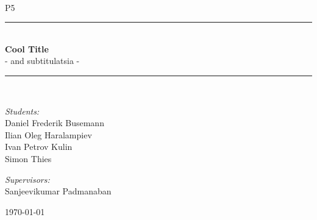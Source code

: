 \newcommand{\HRule}{\rule{\linewidth}{0.5 mm}}
\begin{titlepage}

\begin{center}
\\[0.5cm]

\textsc{\Large P5}\\[0.6cm]

\HRule \\[0.8cm]
{ \Huge \bfseries  Cool Title}\\[0.4cm]

  \Large{ - and subtitulatsia -
  }
\HRule \\[1.2cm]

\begin{minipage}{0.49\textwidth}
\begin{flushleft} \large
\emph{Students:}\\
Daniel Frederik Busemann\\
Ilian Oleg Haralampiev\\
Ivan Petrov Kulin\\
Simon Thies\\
\end{flushleft}
\end{minipage}
\begin{minipage}{0.49\textwidth}
\begin{flushright} \large
\emph{Supervisors:} \\
Sanjeevikumar Padmanaban
\end{flushright}
\end{minipage}

\vfill

{\large \today}



\end{center}

\end{titlepage}

